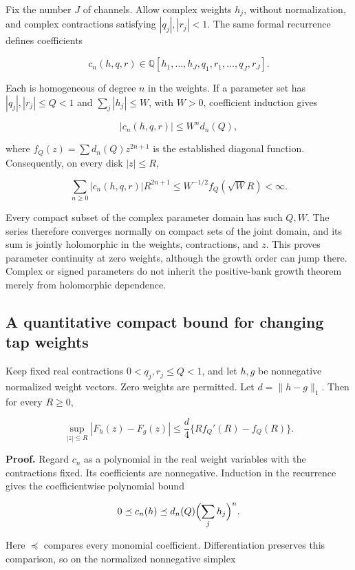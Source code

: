 Fix the number \(J\) of channels. Allow complex weights \(h_j\), without
normalization, and complex contractions satisfying \(|q_j|,|r_j|<1\).
The same formal recurrence defines coefficients

\[
c_n(h,q,r)\in\mathbb Q[h_1,\ldots,h_J,q_1,r_1,\ldots,q_J,r_J].
\]

Each is homogeneous of degree \(n\) in the weights. If a parameter set
has \(|q_j|,|r_j|\le Q<1\) and \(\sum_j|h_j|\le W\), with \(W>0\),
coefficient induction gives

\[
|c_n(h,q,r)|\le W^n d_n(Q),
\]

where \(f_Q(z)=\sum d_n(Q)z^{2n+1}\) is the established diagonal
function. Consequently, on every disk \(|z|\le R\),

\[
\sum_{n\ge0}|c_n(h,q,r)|R^{2n+1}
\le W^{-1/2}f_Q(\sqrt W R)<\infty.
\]

Every compact subset of the complex parameter domain has such \(Q,W\).
The series therefore converges normally on compact sets of the joint
domain, and its sum is jointly holomorphic in the weights, contractions,
and \(z\). This proves parameter continuity at zero weights, although
the growth order can jump there. Complex or signed parameters do not
inherit the positive-bank growth theorem merely from holomorphic
dependence.

\hypertarget{a-quantitative-compact-bound-for-changing-tap-weights}{%
\subsection{A quantitative compact bound for changing tap
weights}\label{a-quantitative-compact-bound-for-changing-tap-weights}}

Keep fixed real contractions \(0<q_j,r_j\le Q<1\), and let \(h,g\) be
nonnegative normalized weight vectors. Zero weights are permitted. Let
\(d=\|h-g\|_1\). Then for every \(R\ge0\),

\[
\boxed{\sup_{|z|\le R}|F_h(z)-F_g(z)|
\le\frac d4\{R f_Q'(R)-f_Q(R)\}.}
\]

\textbf{Proof.} Regard \(c_n\) as a polynomial in the real weight
variables with the contractions fixed. Its coefficients are nonnegative.
Induction in the recurrence gives the coefficientwise polynomial bound

\[
0\preceq c_n(h)\preceq d_n(Q)\Bigl(\sum_jh_j\Bigr)^n.
\]

Here \(\preceq\) compares every monomial coefficient. Differentiation
preserves this comparison, so on the normalized nonnegative simplex

